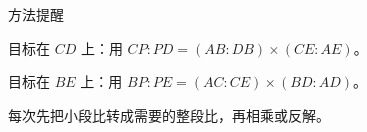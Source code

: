 \documentclass{exam-zh}
\begin{document}
\begin{eduSummaryBlock}{\eduIconPin}{方法提醒}
\begin{eduBulletList}
  \item 目标在 $CD$ 上：用 $CP:PD=(AB:DB)\times(CE:AE)$。  \item 目标在 $BE$ 上：用 $BP:PE=(AC:CE)\times(BD:AD)$。  \item 每次先把小段比转成需要的整段比，再相乘或反解。\end{eduBulletList}
\end{eduSummaryBlock}
\end{document}
